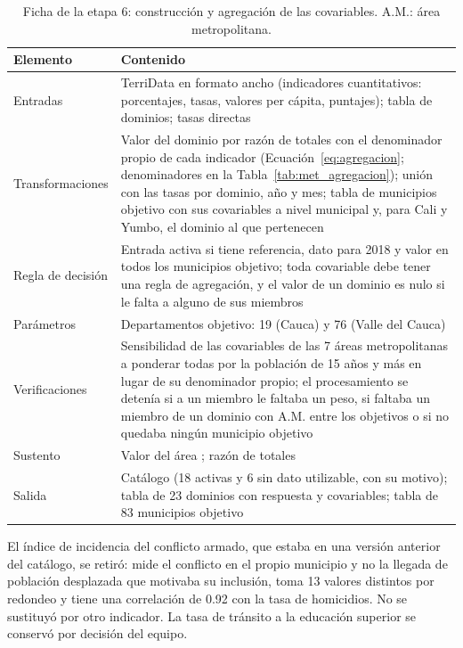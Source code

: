 \begin{table}[!htbp]
\centering
\small
\caption[Ficha de la etapa 6: construcción y agregación de las covariables]{Ficha de la etapa 6: construcción y agregación de las covariables. A.M.: área metropolitana.}
\label{tab:met_covariables}
\renewcommand{\arraystretch}{1.15}
\begin{tabularx}{\linewidth}{>{\raggedright\arraybackslash}p{2.8cm} >{\raggedright\arraybackslash}X}
\toprule
Elemento & Contenido \\
\midrule
Entradas & TerriData en formato ancho (indicadores cuantitativos: porcentajes, tasas, valores per cápita, puntajes); tabla de dominios; tasas directas \\
Transformaciones & Valor del dominio por razón de totales con el denominador propio de cada indicador (Ecuación~\ref{eq:agregacion}; denominadores en la Tabla~\ref{tab:met_agregacion}); unión con las tasas por dominio, año y mes; tabla de municipios objetivo con sus covariables a nivel municipal y, para Cali y Yumbo, el dominio al que pertenecen \\
Regla de decisión & Entrada activa si tiene referencia, dato para 2018 y valor en todos los municipios objetivo; toda covariable debe tener una regla de agregación, y el valor de un dominio es nulo si le falta a alguno de sus miembros \\
Parámetros & Departamentos objetivo: 19 (Cauca) y 76 (Valle del Cauca) \\
Verificaciones & Sensibilidad de las covariables de las 7 áreas metropolitanas a ponderar todas por la población de 15 años y más en lugar de su denominador propio; el procesamiento se detenía si a un miembro le faltaba un peso, si faltaba un miembro de un dominio con A.M. entre los objetivos o si no quedaba ningún municipio objetivo \\
Sustento & Valor del área \cite[p.~425]{morales2021smallarea}; razón de totales \cite[p.~21]{morales2021smallarea} \\
Salida & Catálogo (18 activas y 6 sin dato utilizable, con su motivo); tabla de 23 dominios con respuesta y covariables; tabla de 83 municipios objetivo \\
\bottomrule
\end{tabularx}
\end{table}

El índice de incidencia del conflicto armado, que estaba en una versión anterior del catálogo, se retiró: mide el conflicto en el propio municipio y no la llegada de población desplazada que motivaba su inclusión, toma 13 valores distintos por redondeo y tiene una correlación de 0.92 con la tasa de homicidios. No se sustituyó por otro indicador. La tasa de tránsito a la educación superior se conservó por decisión del equipo.

